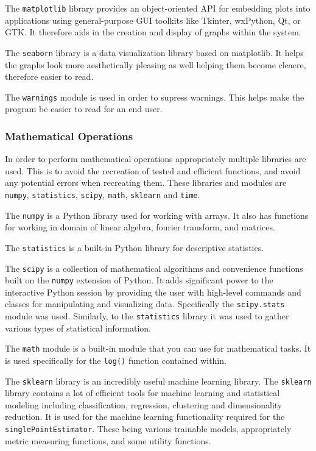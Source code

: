 The \verb|matplotlib| library provides an object-oriented API for embedding plots into applications using general-purpose GUI toolkits like Tkinter, wxPython, Qt, or GTK. It therefore aids in the creation and display of graphs within the system.

The \verb|seaborn| library is a data visualization library based on matplotlib. It helps the graphs look more aesthetically pleasing as well helping them become cleaere, therefore easier to read.

The \verb|warnings| module is used in order to supress warnings. This helps make the program be easier to read for an end user.

\subsubsection{Mathematical Operations}

In order to perform mathematical operations appropriately multiple libraries are used. This is to avoid the recreation of tested and efficient functions, and avoid any potential errors when recreating them. These libraries and modules are \verb|numpy|, \verb|statistics|, \verb|scipy|, \verb|math|, \verb|sklearn| and \verb|time|.

The \verb|numpy| is a Python library used for working with arrays. It also has functions for working in domain of linear algebra, fourier transform, and matrices.

The \verb|statistics| is a built-in Python library for descriptive statistics.

The \verb|scipy| is a collection of mathematical algorithms and convenience functions built on the \verb|numpy| extension of Python. It adds significant power to the interactive Python session by providing the user with high-level commands and classes for manipulating and visualizing data. Specifically the \verb|scipy.stats| module was used. Similarly, to the \verb|statistics| library it was used to gather various types of statistical information.

The \verb|math| module is a built-in module that you can use for mathematical tasks. It is used specifically for the \verb|log()| function contained within.

The \verb|sklearn| library is an incredibly useful machine learning library. The \verb|sklearn| library contains a lot of efficient tools for machine learning and statistical modeling including classification, regression, clustering and dimensionality reduction. It is used for the machine learning functionality required for the \verb|singlePointEstimator|. These being various trainable models, appropriately metric measuring functions, and some utility functions.

